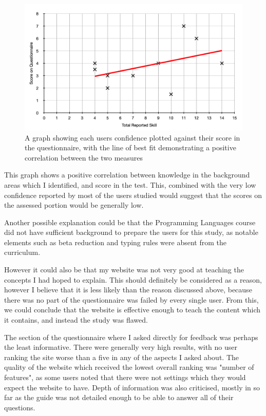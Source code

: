 \documentclass{l4proj}
\begin{document}
\begin{figure}[h!]
    \centering
    \includegraphics[width=1\linewidth]{dissertation/images/skill_against_score.png}
    \caption{A graph showing each users confidence plotted against their score in the questionnaire, with the line of best fit demonstrating a positive correlation between the two measures}
    \label{fig:enter-label}
\end{figure}    

This graph shows a positive correlation between knowledge in the background areas which I identified, and score in the test.  This, combined with the very low confidence reported by most of the users studied would suggest that the scores on the assessed portion would be generally low.

Another possible explanation could be that the Programming Languages course did not have sufficient background to prepare the users for this study, as notable elements such as beta reduction and typing rules were absent from the curriculum. 

However it could also be that my website was not very good at teaching the concepts I had hoped to explain.  This should definitely be considered as a reason, however I believe that it is less likely than the reason discussed above, because there was no part of the questionnaire was failed by every single user.  From this, we could conclude that the website is effective enough to teach the content which it contains, and instead the study was flawed.

The section of the questionnaire where I asked directly for feedback was perhaps the least informative.  There were generally very high results, with no user ranking the site worse than a five in any of the aspects I asked about.  The quality of the website which received the lowest overall ranking was "number of features", as some users noted that there were not settings which they would expect the website to have.  Depth of information was also criticised, mostly in so far as the guide was not detailed enough to be able to answer all of their questions.
\end{document}
